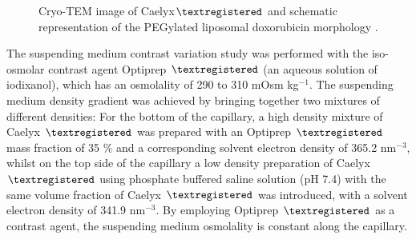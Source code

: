 \begin{figure}
	\centering
		\caption{Cryo-TEM image of Caelyx$\textregistered$ \cite{barenholz_doxil_2012} and schematic representation of the PEGylated liposomal doxorubicin morphology \cite{garcia-diez_size_2016}.}
\end{figure}

The suspending medium contrast variation study was performed with the iso-osmolar contrast agent Optiprep $\textregistered$ (an aqueous solution of iodixanol), which has an osmolality of 290 to 310 mOsm kg$^{-1}$. The suspending medium density gradient was achieved by bringing together two mixtures of different densities: For the bottom of the capillary, a high density mixture of Caelyx $\textregistered$ was prepared with an Optiprep $\textregistered$ mass fraction of 35 $\%$ and a corresponding solvent electron density of 365.2 nm$^{-3}$, whilst on the top side of the capillary a low density preparation of Caelyx $\textregistered$  using phosphate buffered saline solution (pH 7.4) with the same volume fraction of Caelyx $\textregistered$ was introduced, with a solvent electron density of 341.9 nm$^{-3}$. By employing Optiprep $\textregistered$ as a contrast agent, the suspending medium osmolality is constant along the capillary. 

